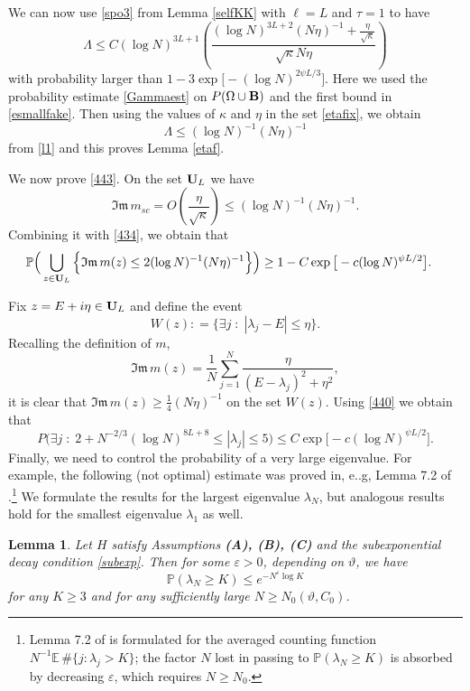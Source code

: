 \documentclass[draft]{article}
\newcommand{\ttau}{\vartheta}
\newcommand{\e}{\varepsilon}
\newcommand{\be}{\begin{equation}}
\newcommand{\ee}{\end{equation}}
\newcommand{\im}{{\mathfrak{Im} \, }}
\newcommand{\E}{{\mathbb E }}
\renewcommand{\P}{{\mathbb P}}
\newcommand{\bU}{ {\bf  U}}
\newtheorem{lemma}[theorem]{Lemma}
\newcommand{\qed}{\hfill\fbox{}\par\vspace{0.3mm}}
\numberwithin{equation}{section}
\numberwithin{theorem}{section}
\numberwithin{definition}{section}
\numberwithin{remark}{section}
\begin{document}
 We can now  use \eqref{spo3} from Lemma \ref{selfKK} with $\ell =L$ and $\tau=1$ to have 
\be\label{l1}
\Lambda 
\leq C(\log N)^{3 L+1}\left(\frac{(\log N)^{3L+2}(N\eta)^{-1}+\frac{\eta}{\sqrt{\kappa}} }
{\sqrt{\kappa} N\eta}\right)
\ee
with probability larger than $1- 3\exp{\big[-(\log N)^{2\psi L/3} \big]}$.
Here we used the probability estimate \eqref{Gammaest} on $P(\Omega\cup{\bf B})$ and
the first bound in \eqref{esmallfake}.
Then using the values of $\kappa$ and $\eta$ in the set   \eqref{etafix}, we obtain 
$$
\Lambda\leq (\log N)^{-1}(N\eta)^{-1} 
$$
from \eqref{l1} and this proves Lemma \ref{etaf}.  \qed


\medskip 

We now prove  \eqref{443}. On the set $\bU_L$ we have 
\be
\im m_{sc}=O(\frac{\eta}{\sqrt\kappa})\leq  (\log N)^{-1}(N\eta)^{-1}.
\ee
Combining it with \eqref{434}, we obtain that 
\be\label{440}
\P \Big (\bigcup_{z\in \bU_L}
 \Big\{ 
\im m(z)\leq 2(\log N)^{-1}(N\eta)^{-1}   \Big\}  \Big )
  \ge 1-   C\exp{\big[-c(\log N)^{ \psi L/2  } \big]}.  \quad 
\ee


Fix $z=E+i\eta\in \bU_L$ and define the event
$$
   W(z): =\{ \exists j \; : \; |\lambda_j-E|\le\eta\}.
$$
Recalling the definition of $m$,
\be
\im m(z)=\frac1N\sum_{j=1}^N\frac{\eta}{(E-\lambda_j)^2 +\eta^2},
\ee  
it is clear that $\im m(z)\ge \frac{1}{4}(N\eta)^{-1}$ on the set $W(z)$.
Using \eqref{440} we obtain that 
\be\label{ext}
   P\Big( \exists j\; : \; 2+N^{-2/3}(\log N)^{8L+8}\le |\lambda_j|\le 5\Big)
  \le C\exp{\big[-c(\log N)^{ \psi L/2  } \big]}.
\ee
Finally, we need to control the probability of a very large eigenvalue. For example, the following 
(not optimal) estimate was  proved in, e..g,  
 Lemma 7.2 of \cite{EYY}.\footnote{Lemma 7.2 of \cite{EYY} is formulated for the averaged
counting function $N^{-1}\E\,\#\{j: \lambda_j > K\}$; the factor $N$ lost in passing to
$\P(\lambda_N\ge K)$ is absorbed by decreasing $\e$, which requires $N\ge N_0$.} We formulate the results for the largest eigenvalue $\lambda_N$,
but analogous results hold for the smallest eigenvalue $\lambda_1$ as well.



\begin{lemma}\label{N-1/6}
 Let $H$ satisfy Assumptions {\bf (A), (B), (C)} and the subexponential decay condition
\eqref{subexp}.
Then for some $\e>0$, depending on $\ttau$, we have 
\be\label{5.2}
\P ( \lambda_N \ge K )\leq e^{-N^\e\log K}
\ee
for any $K\ge 3$ and for any sufficiently large $N\ge N_0(\ttau, C_0)$.
\end{lemma}
\end{document}
